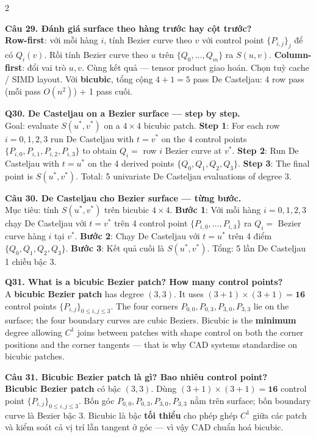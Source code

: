 \begin{paracol}{2}
\switchcolumn

\textbf{Câu 29. Đánh giá surface theo hàng trước hay cột trước?}\\
\textbf{Row-first}: với mỗi hàng $i$, tính Bezier curve theo $v$ với control point $\{P_{i,j}\}_{j}$ để có $Q_i(v)$. Rồi tính Bezier curve theo $u$ trên $\{Q_0,\ldots,Q_m\}$ ra $S(u,v)$. \textbf{Column-first}: đổi vai trò $u, v$. Cùng kết quả — tensor product giao hoán. Chọn tuỳ cache / SIMD layout. Với \textbf{bicubic}, tổng cộng $4+1=5$ pass De Casteljau: 4 row pass (mỗi pass $O(n^2)$) + 1 pass cuối.

\switchcolumn*

\textbf{Q30. De Casteljau on a Bezier surface — step by step.}\\
Goal: evaluate $S(u^*, v^*)$ on a $4\times 4$ bicubic patch.
\textbf{Step 1}: For each row $i=0,1,2,3$ run De Casteljau with $t=v^*$ on the 4 control points $\{P_{i,0},P_{i,1},P_{i,2},P_{i,3}\}$ to obtain $Q_i = $ row $i$ Bezier curve at $v^*$.
\textbf{Step 2}: Run De Casteljau with $t=u^*$ on the 4 derived points $\{Q_0, Q_1, Q_2, Q_3\}$.
\textbf{Step 3}: The final point is $S(u^*, v^*)$. Total: 5 univariate De Casteljau evaluations of degree 3.

\switchcolumn

\textbf{Câu 30. De Casteljau cho Bezier surface — từng bước.}\\
Mục tiêu: tính $S(u^*, v^*)$ trên bicubic $4\times 4$.
\textbf{Bước 1}: Với mỗi hàng $i=0,1,2,3$ chạy De Casteljau với $t=v^*$ trên 4 control point $\{P_{i,0},\ldots,P_{i,3}\}$ ra $Q_i = $ Bezier curve hàng $i$ tại $v^*$.
\textbf{Bước 2}: Chạy De Casteljau với $t=u^*$ trên 4 điểm $\{Q_0, Q_1, Q_2, Q_3\}$.
\textbf{Bước 3}: Kết quả cuối là $S(u^*, v^*)$. Tổng: 5 lần De Casteljau 1 chiều bậc 3.

\switchcolumn*

\textbf{Q31. What is a bicubic Bezier patch? How many control points?}\\
A \textbf{bicubic Bezier patch} has degree $(3,3)$. It uses $(3{+}1)\times(3{+}1)=\mathbf{16}$ control points $\{P_{i,j}\}_{0\le i,j\le 3}$. The four corners $P_{0,0}, P_{0,3}, P_{3,0}, P_{3,3}$ lie on the surface; the four boundary curves are cubic Beziers. Bicubic is the \textbf{minimum} degree allowing $C^1$ joins between patches with shape control on both the corner positions and the corner tangents — that is why CAD systems standardise on bicubic patches.

\switchcolumn

\textbf{Câu 31. Bicubic Bezier patch là gì? Bao nhiêu control point?}\\
\textbf{Bicubic Bezier patch} có bậc $(3,3)$. Dùng $(3{+}1)\times(3{+}1)=\mathbf{16}$ control point $\{P_{i,j}\}_{0\le i,j\le 3}$. Bốn góc $P_{0,0}, P_{0,3}, P_{3,0}, P_{3,3}$ nằm trên surface; bốn boundary curve là Bezier bậc 3. Bicubic là bậc \textbf{tối thiểu} cho phép ghép $C^1$ giữa các patch và kiểm soát cả vị trí lẫn tangent ở góc — vì vậy CAD chuẩn hoá bicubic.


\end{paracol}
